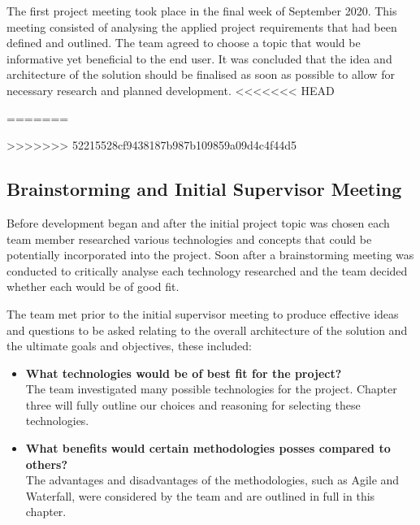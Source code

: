 \vspace{5mm} %

The first project meeting took place in the final week of September 2020. This meeting consisted of analysing the applied project requirements that had been defined and outlined. The team agreed to choose a topic that would be informative yet beneficial to the end user. It was concluded that the idea and architecture of the solution should be finalised as soon as possible to allow for necessary research and planned development.
<<<<<<< HEAD


=======


>>>>>>> 52215528cf9438187b987b109859a09d4c4f44d5
\subsection{Brainstorming and Initial Supervisor Meeting}
Before development began and after the initial project topic was chosen each team member researched various technologies and concepts that could be potentially incorporated into the project. Soon after a brainstorming meeting was conducted to critically analyse each technology researched and the team decided whether each would be of good fit.

\vspace{5mm} %

The team met prior to the initial supervisor meeting to produce effective ideas and questions to be asked relating to the overall architecture of the solution and the ultimate goals and objectives, these included:
\vspace{5mm} %

\begin{itemize}


    \item \textbf{What technologies would be of best fit for the project?} \\
The team investigated many possible technologies for the project. Chapter three will fully outline our choices and reasoning for selecting these technologies.

    \item \textbf{What benefits would certain methodologies posses compared to others?}\\
The advantages and disadvantages of the methodologies, such as Agile and Waterfall, were considered by the team and are outlined in full in this chapter.
\end{itemize}

